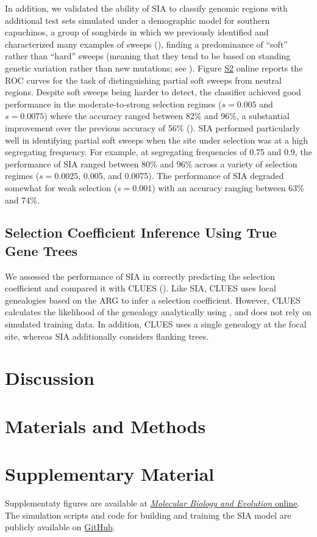 In addition, we validated the ability of \ac{SIA} to classify genomic regions with additional test sets simulated under a demographic model for southern capuchinos, a group of songbirds in which we previously identified and characterized many examples of sweeps (\cite{hejase_genomic_2020}), finding a predominance of “soft” rather than “hard” sweeps (meaning that they tend to be based on standing genetic variation rather than new mutations; see ). Figure \href{https://academic.oup.com/mbe/article/39/1/msab332/6433161#supplementary-data}{S2} online reports the \ac{ROC} curves for the task of distinguishing partial soft sweeps from neutral regions. Despite soft sweeps being harder to detect, the classifier achieved good performance in the moderate-to-strong selection regimes ($s=0.005$ and $s=0.0075$) where the accuracy ranged between 82\% and 96\%, a substantial improvement over the previous accuracy of 56\% (\cite{hejase_genomic_2020}). \ac{SIA} performed particularly well in identifying partial soft sweeps when the site under selection was at a high segregating frequency. For example, at segregating frequencies of 0.75 and 0.9, the performance of \ac{SIA} ranged between 80\% and 96\% across a variety of selection regimes ($s=0.0025$, 0.005, and 0.0075). The performance of \ac{SIA} degraded somewhat for weak selection ($s=0.001$) with an accuracy ranging between 63\% and 74\%.

\subsection{Selection Coefficient Inference Using True Gene Trees}
We assessed the performance of \ac{SIA} in correctly predicting the selection coefficient and compared it with CLUES (\cite{stern_approximate_2019}). Like \ac{SIA}, CLUES uses local genealogies based on the \ac{ARG} to infer a selection coefficient. However, CLUES calculates the likelihood of the genealogy analytically using , and does not rely on simulated training data. In addition, CLUES uses a single genealogy at the focal site, whereas \ac{SIA} additionally considers flanking trees.

\section{Discussion}

\section{Materials and Methods} \label{methods}

\section{Supplementary Material}

Supplementaty figures are available at \href{https://academic.oup.com/mbe/article/39/1/msab332/6433161#supplementary-data}{\textit{Molecular Biology and Evolution} online}. The simulation scripts and code for building and training the \ac{SIA} model are publicly available on \href{https://github.com/CshlSiepelLab/arg-selection}{GitHub}.
